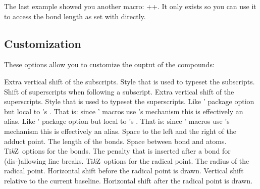 \documentclass[load-preamble+]{cnltx-doc}
\newcommand*\TikZ{Ti\textit{k}Z}
\begin{document}
The last example showed you another macro: \verbcode+\chemformula@bondlength+.
It only exists so you can use it to access the bond length as set with
 directly.

\subsection{Customization}\label{ssec:compounds:customization}
These options allow you to customize the ouptut of the compounds:
\begin{options}
  \Default{0pt}
    Extra vertical shift of the subscripts.
    Style that is used to typeset the subscripts.
  \Default{.25em}
    Shift of superscripts when following a subscript.\label{desc:charge-hshift}
  \Default{0pt}
    Extra vertical shift of the superscripts.
    Style that is used to typeset the superscripts.
    Like \chemmacros' package option but local to
    \chemformula's .  That is: since \chemmacros' macros use
    \chemformula's mechanism this is effectively an alias.
    Like \chemmacros' package option but local to
    \chemformula's .  That is: since \chemmacros' macros use
    \chemformula's mechanism this is effectively an alias.
  \Default{.1333em}
    Space to the left and the right of the adduct point.
  \Default{.5833em}
    The length of the bonds.
  \Default{.07em}
    Space between bond and atoms.
  \keyval{bond-style}{\TikZ}\Default
    \TikZ\ options for the bonds.
    The penalty that is inserted after a bond for
    (dis-)allowing line breaks.
  \keyval{radical-style}{\TikZ}\Default
    \TikZ\ options for the radical point.
  \Default{.2ex}
    The radius of the radical point.
  \Default{.15em}
    Horizontal shift before the radical point is drawn.
  \Default{.5ex}
    Vertical shift relative to the current baseline.
  \Default{.15em}
    Horizontal shift after the radical point is drawn.
\end{options}
\end{document}
